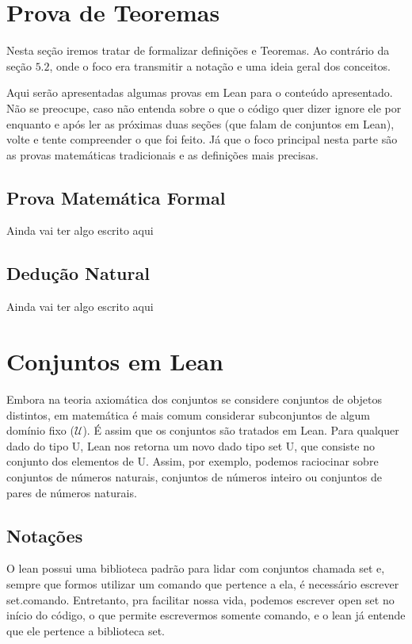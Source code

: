 \section{Prova de Teoremas}
Nesta seção iremos tratar de formalizar definições e Teoremas. Ao contrário da seção $5.2$, onde o foco era transmitir a notação e uma ideia geral dos conceitos.

Aqui serão apresentadas algumas provas em Lean para o conteúdo apresentado. Não se preocupe, caso não entenda sobre o que o código quer dizer ignore ele por enquanto e após ler as próximas duas seções (que falam de conjuntos em Lean), volte e tente compreender o que foi feito. Já que o foco principal nesta parte são as provas matemáticas tradicionais e as definições mais precisas.

\subsection{Prova Matemática Formal}
Ainda vai ter algo escrito aqui

\subsection{Dedução Natural}
Ainda vai ter algo escrito aqui

\section{Conjuntos em Lean}
Embora na teoria axiomática dos conjuntos se considere conjuntos de objetos distintos, em matemática é mais comum considerar subconjuntos de algum domínio fixo ($\mathcal U $). É assim que os conjuntos são tratados em Lean. Para qualquer dado do tipo {\selectfont U}, Lean nos retorna um novo dado tipo {\selectfont set U}, que consiste no conjunto dos elementos de {\selectfont U}. Assim, por exemplo, podemos raciocinar sobre conjuntos de números naturais, conjuntos de números inteiro ou conjuntos de pares de números naturais.

\subsection{Notações}
O lean possui uma biblioteca padrão para lidar com conjuntos chamada {\selectfont set} e, sempre que formos utilizar um comando que pertence a ela, é necessário escrever {\selectfont set.comando}. Entretanto, pra facilitar nossa vida, podemos escrever {\selectfont open set} no início do código, o que permite escrevermos somente {\selectfont comando}, e o lean já entende que ele pertence a biblioteca set.

